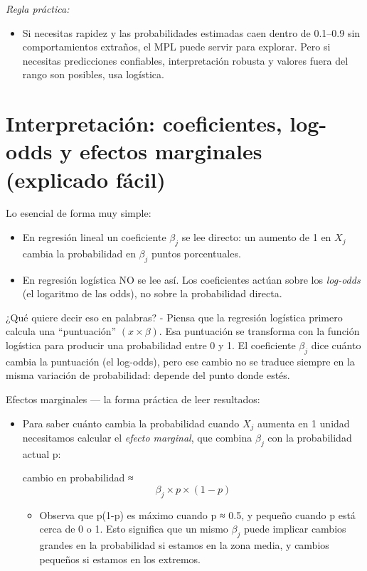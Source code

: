 \documentclass[
  spanish,
  letterpaper,
  DIV=11,
  numbers=noendperiod]{scrreprt}
\providecommand{\tightlist}{%
  \setlength{\itemsep}{0pt}\setlength{\parskip}{0pt}}
\begin{document}
\emph{Regla práctica:}

\begin{itemize}
\tightlist
\item
  Si necesitas rapidez y las probabilidades estimadas caen dentro de
  0.1--0.9 sin comportamientos extraños, el MPL puede servir para
  explorar. Pero si necesitas predicciones confiables, interpretación
  robusta y valores fuera del rango son posibles, usa logística.
\end{itemize}

\section{Interpretación: coeficientes, log-odds y efectos marginales
(explicado
fácil)}\label{interpretaciuxf3n-coeficientes-log-odds-y-efectos-marginales-explicado-fuxe1cil}

Lo esencial de forma muy simple:

\begin{itemize}
\tightlist
\item
  En regresión lineal un coeficiente \(β_j\) se lee directo: un aumento
  de 1 en \(X_j\) cambia la probabilidad en \(β_j\) puntos porcentuales.
\item
  En regresión logística NO se lee así. Los coeficientes actúan sobre
  los \emph{log-odds} (el logaritmo de las odds), no sobre la
  probabilidad directa.
\end{itemize}

¿Qué quiere decir eso en palabras? - Piensa que la regresión logística
primero calcula una ``puntuación'' \((x \times β)\). Esa puntuación se
transforma con la función logística para producir una probabilidad entre
0 y 1. El coeficiente \(β_j\) dice cuánto cambia la puntuación (el
log-odds), pero ese cambio no se traduce siempre en la misma variación
de probabilidad: depende del punto donde estés.

Efectos marginales --- la forma práctica de leer resultados:

\begin{itemize}
\item
  Para saber cuánto cambia la probabilidad cuando \(X_j\) aumenta en 1
  unidad necesitamos calcular el \emph{efecto marginal}, que combina
  \(β_j\) con la probabilidad actual p:

  cambio en probabilidad ≈ \[ β_j × p × (1 - p)\]

  \begin{itemize}
  \tightlist
  \item
    Observa que p(1-p) es máximo cuando p ≈ 0.5, y pequeño cuando p está
    cerca de 0 o 1. Esto significa que un mismo \(β_j\) puede implicar
    cambios grandes en la probabilidad si estamos en la zona media, y
    cambios pequeños si estamos en los extremos.
  \end{itemize}
\end{itemize}
\end{document}

